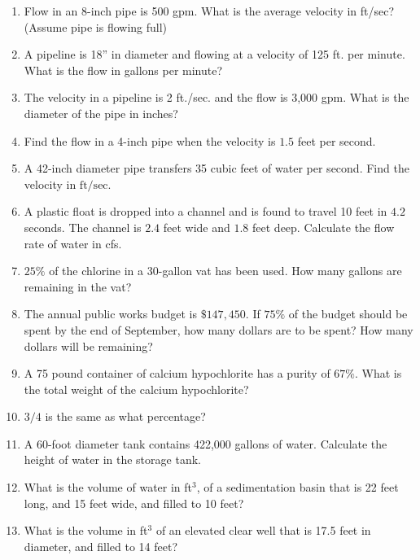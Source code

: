 \begin{enumerate}[1.]
\item Flow in an 8-inch pipe is 500 gpm. What is the average velocity in ft/sec? (Assume pipe is flowing full)

\item A pipeline is 18” in diameter and flowing at a velocity of 125 ft. per minute. What is the flow in gallons per minute?

\item The velocity in a pipeline is 2 ft./sec. and the flow is 3,000 gpm. What is the diameter of the pipe in inches?



\item Find the flow in a 4-inch pipe when the velocity is $1.5$ feet per second.

  \item A 42-inch diameter pipe transfers 35 cubic feet of water per second. Find the velocity in $\mathrm{ft} / \mathrm{sec}$. 
  
  \item A plastic float is dropped into a channel and is found to travel 10 feet in $4.2$ seconds. The channel is $2.4$ feet wide and $1.8$ feet deep. Calculate the flow rate of water in cfs.
  
\item $25 \%$ of the chlorine in a 30-gallon vat has been used. How many gallons are remaining in the vat?

\item The annual public works budget is $\$ 147,450$. If $75 \%$ of the budget should be spent by the end of September, how many dollars are to be spent? How many dollars will be remaining?

\item A 75 pound container of calcium hypochlorite has a purity of $67 \%$. What is the total weight of the calcium hypochlorite? 

\item $3 / 4$ is the same as what percentage?

\item A 60-foot diameter tank contains 422,000 gallons of water. Calculate the height of water in the storage tank.

\item What is the volume of water in ft$^3$, of a sedimentation basin that is 22 feet long, and 15 feet wide, and filled to 10 feet?

\item What is the volume in ft$^3$ of an elevated clear well that is 17.5 feet in diameter, and filled to 14 feet?


\end{enumerate}
